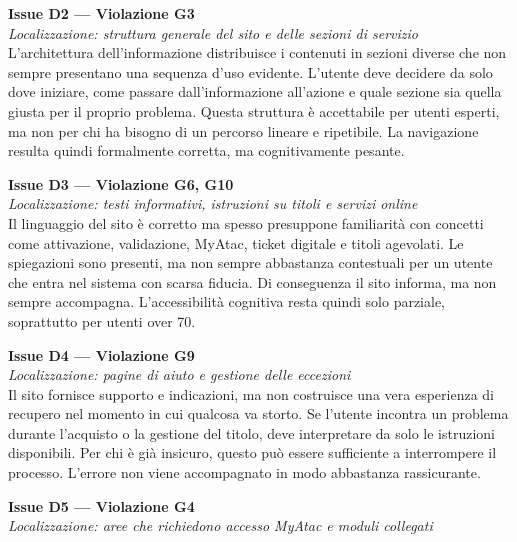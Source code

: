 \documentclass[11pt,a4paper]{article}
\begin{document}
\bigskip

\noindent\textbf{Issue D2 — Violazione G3}\label{atac:D2}\\
\textit{Localizzazione: struttura generale del sito e delle sezioni di servizio}\\

\noindent L’architettura dell’informazione distribuisce i contenuti in sezioni diverse che non sempre presentano una sequenza d’uso evidente. L’utente deve decidere da solo dove iniziare, come passare dall’informazione all’azione e quale sezione sia quella giusta per il proprio problema. Questa struttura è accettabile per utenti esperti, ma non per chi ha bisogno di un percorso lineare e ripetibile. La navigazione resulta quindi formalmente corretta, ma cognitivamente pesante.

\bigskip

\noindent\textbf{Issue D3 — Violazione G6, G10}\label{atac:D3}\\
\textit{Localizzazione: testi informativi, istruzioni su titoli e servizi online}\\

\noindent Il linguaggio del sito è corretto ma spesso presuppone familiarità con concetti come attivazione, validazione, MyAtac, ticket digitale e titoli agevolati. Le spiegazioni sono presenti, ma non sempre abbastanza contestuali per un utente che entra nel sistema con scarsa fiducia. Di conseguenza il sito informa, ma non sempre accompagna. L’accessibilità cognitiva resta quindi solo parziale, soprattutto per utenti over 70.

\bigskip

\noindent\textbf{Issue D4 — Violazione G9}\label{atac:D4}\\
\textit{Localizzazione: pagine di aiuto e gestione delle eccezioni}\\

\noindent Il sito fornisce supporto e indicazioni, ma non costruisce una vera esperienza di recupero nel momento in cui qualcosa va storto. Se l’utente incontra un problema durante l’acquisto o la gestione del titolo, deve interpretare da solo le istruzioni disponibili. Per chi è già insicuro, questo può essere sufficiente a interrompere il processo. L’errore non viene accompagnato in modo abbastanza rassicurante.

\bigskip

\noindent\textbf{Issue D5 — Violazione G4}\label{atac:D5}\\
\textit{Localizzazione: aree che richiedono accesso MyAtac e moduli collegati}\\
\end{document}
